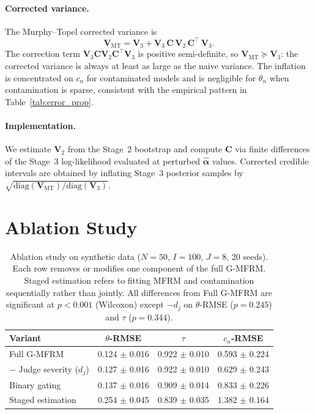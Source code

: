 \paragraph{Corrected variance.} The Murphy--Topel corrected variance is
%
\begin{equation}
\label{eq:murphy_topel}
\mathbf{V}_{\mathrm{MT}} = \mathbf{V}_3 + \mathbf{V}_3\, \mathbf{C}\, \mathbf{V}_2\, \mathbf{C}^\top\, \mathbf{V}_3.
\end{equation}
%
The correction term $\mathbf{V}_3 \mathbf{C} \mathbf{V}_2 \mathbf{C}^\top \mathbf{V}_3$ is positive semi-definite, so $\mathbf{V}_{\mathrm{MT}} \succeq \mathbf{V}_3$: the corrected variance is always at least as large as the naive variance. The inflation is concentrated on $c_n$ for contaminated models and is negligible for $\theta_n$ when contamination is sparse, consistent with the empirical pattern in Table~\ref{tab:error_prop}.

\paragraph{Implementation.} We estimate $\mathbf{V}_2$ from the Stage~2 bootstrap and compute $\mathbf{C}$ via finite differences of the Stage~3 log-likelihood evaluated at perturbed $\hat{\boldsymbol{\alpha}}$ values. Corrected credible intervals are obtained by inflating Stage~3 posterior samples by $\sqrt{\mathrm{diag}(\mathbf{V}_{\mathrm{MT}}) / \mathrm{diag}(\mathbf{V}_3)}$.


\section{Ablation Study}
\label{app:ablation}

\begin{table}[h]
\centering
\scriptsize
\setlength{\tabcolsep}{3pt}
\begin{tabular}{lccc}
\toprule
\textbf{Variant} & $\theta$-RMSE & $\tau$ & $c_n$-RMSE \\
\midrule
Full G-MFRM & 0.124 $\pm$ 0.016 & 0.922 $\pm$ 0.010 & 0.593 $\pm$ 0.224 \\
$-$ Judge severity ($d_j$) & 0.127 $\pm$ 0.016 & 0.922 $\pm$ 0.010 & 0.629 $\pm$ 0.243 \\
Binary gating & 0.137 $\pm$ 0.016 & 0.909 $\pm$ 0.014 & 0.833 $\pm$ 0.226 \\
Staged estimation & 0.254 $\pm$ 0.045 & 0.839 $\pm$ 0.035 & 1.382 $\pm$ 0.164 \\
\bottomrule
\end{tabular}
\caption{Ablation study on synthetic data ($N = 50$, $I = 100$, $J = 8$, 20 seeds). Each row removes or modifies one component of the full G-MFRM. Staged estimation refers to fitting MFRM and contamination sequentially rather than jointly. All differences from Full G-MFRM are significant at $p < 0.001$ (Wilcoxon) except $-d_j$ on $\theta$-RMSE ($p = 0.245$) and $\tau$ ($p = 0.344$).}
\label{tab:ablation}
\end{table}

